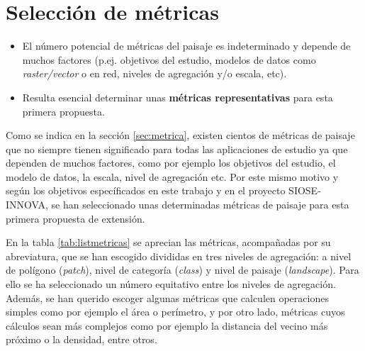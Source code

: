 \section{Selección de métricas}\label{sec:metricas}

\begin{graybox}
\begin{itemize}
\item El número potencial de métricas del paisaje es indeterminado y depende de muchos factores (p.ej. objetivos del estudio, modelos de datos como \textit{raster/vector} o en red, niveles de agregación y/o escala, etc).
\item Resulta esencial determinar unas \textbf{métricas representativas} para esta primera propuesta.
\end{itemize}
\end{graybox}

Como se indica en la sección \ref{sec:metrica}, existen cientos de métricas de paisaje que no siempre tienen significado para todas las aplicaciones de estudio ya que dependen de muchos factores, como por ejemplo los objetivos del estudio, el modelo de datos, la escala, nivel de agregación etc. Por este mismo motivo y según los objetivos específicados en este trabajo y en el proyecto SIOSE-INNOVA, se han seleccionado unas determinadas métricas de paisaje para esta primera propuesta de extensión.

En la tabla \ref{tab:listmetricas} se aprecian las métricas, acompañadas por su abreviatura, que se han escogido divididas en tres niveles de agregación: a nivel de polígono (\textit{patch}), nivel de categoría (\textit{class}) y nivel de paisaje (\textit{landscape}). Para ello se ha seleccionado un número equitativo entre los niveles de agregación. Además, se han querido escoger algunas métricas que calculen operaciones simples como por ejemplo el área o perímetro, y por otro lado, métricas cuyos cálculos sean más complejos como por ejemplo la distancia del vecino más próximo o la densidad, entre otros.

